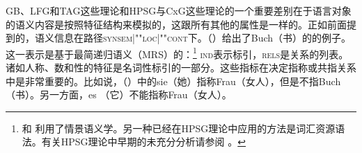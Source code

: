 GB、LFG和TAG这些理论和HPSG与CxG这些理论的一个重要差别在于语言对象的语义内容是按照特征结构来模拟的，这跟所有其他的属性是一样的。正如前面提到的，语义信息在路径\textsc{synsem|""loc|""cont}下。（）给出了Buch（书）的\contvc 的例子。这一表示是基于最简递归语义\indexmrsc （MRS）的：\footnote{%
  \citet{ps2}和 \citet{GSag2000a-u}利用了情景语义学\citep*{BP83a,CMP90,Devlin92}\nocite{BP87a}。另一种已经在HPSG理论中应用的方法是词汇资源语法\citep{RS2004a-u}。有关HPSG理论中早期的未充分分析请参阅 。
}
\ea
\label{le-buch}
\z
\textsc{ind}表示标引，\textsc{rels}是关系的列表。诸如人称、数和性的特征是名词性标引的一部分。这些指标在决定指称或共指关系中是非常重要的。比如说，（）中的sie（她）指称Frau（女人），但是不指Buch（书）。另一方面，es （它）不能指称Frau（女人）。
